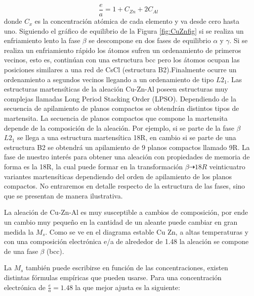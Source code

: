 \documentclass[a4paper,12pt,fleqn,twoside,openany]{book}
\begin{document}
\begin{equation}
\frac{e}{a} = 1+C_{Zn}+2C_{Al}
\end{equation}
donde $C_{x}$ es la concentración atómica de cada elemento y va desde cero hasta uno. 
Siguiendo el gráfico de equilibrio de la Figura \ref{fig:CuZnfig} si se realiza 
un enfriamiento lento la fase $\beta$ se descompone en dos fases de equilibrio $\alpha$ y $\gamma$. Si se realiza un enfriamiento rápido los átomos sufren un ordenamiento de primeros vecinos, esto es, continúan con una estructura bcc pero los átomos ocupan las posiciones similares a una red de CsCl (estructura B2).Finalmente ocurre un ordenamiento a segundos vecinos llegando a un ordenamiento de tipo $L2_1$. Las estructuras martensíticas de la aleación Cu-Zn-Al 
poseen estructuras muy complejas llamadas Long Period Stacking Order (LPSO). Dependiendo de la secuencia de apilamiento de planos 
compactos se obtendrán distintos tipos de martensita. La secuencia de planos compactos que compone la martensita depende de la composición de la 
aleación. Por ejemplo, si se parte de la fase $\beta$ $L2_1$ se llega a una estructura martensítica 18R, en cambio si se parte de una estructura B2 se 
obtendrá un apilamiento de 9 planos compactos llamado 9R. La fase de nuestro interés para obtener una aleación con propiedades de memoria de forma 
es la 18R, la cual puede formar en la transformación $\beta \dashrightarrow 18R$ veinticuatro variantes martensíticas dependiendo del orden de apilamiento 
de los planos compactos. No entraremos en detalle respecto de la estructura de las fases, sino que se presentan de manera ilustrativa.



La aleación de Cu-Zn-Al es muy susceptible a cambios de composición, por ende un cambio muy pequeño en la cantidad de un aleante puede cambiar en gran medida la $M_s$. 
Como se ve en el diagrama estable Cu Zn, a altas temperaturas y con una composición electrónica e/a de alrededor de 1.48 la aleación se compone de una fase $\beta$ (bcc). 

La $M_{s}$ también puede escribirse en función de las concentraciones, existen 
distintas fórmulas empíricas que pueden usarse. Para una concentración electrónica de $\frac{e}{a}=1.48$ la que mejor ajusta es la siguiente:
\end{document}
